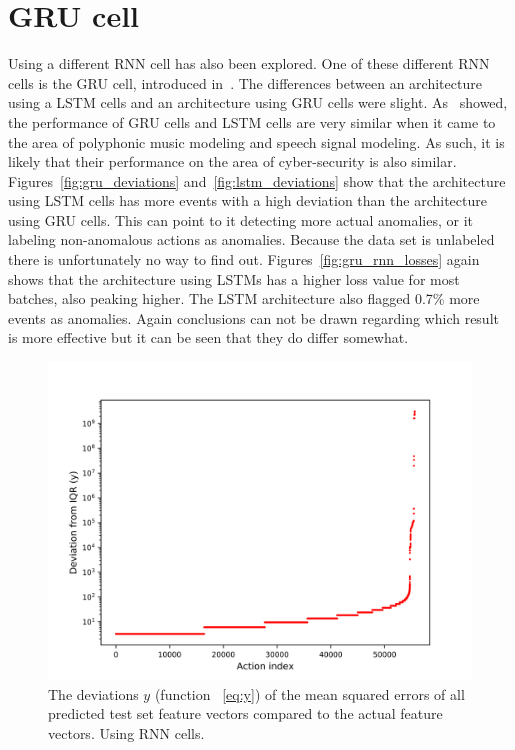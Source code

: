 \section{GRU cell}
Using a different RNN cell has also been explored. One of these different RNN cells is the GRU cell, introduced in~\cite{cho2014learning}. The differences between an architecture using a LSTM cells and an architecture using GRU cells were slight. As~\cite{chung2014empirical} showed, the performance of GRU cells and LSTM cells are very similar when it came to the area of polyphonic music modeling and speech signal modeling. As such, it is likely that their performance on the area of cyber-security is also similar. Figures~\ref{fig:gru_deviations} and~\ref{fig:lstm_deviations} show that the architecture using LSTM cells has more events with a high deviation than the architecture using GRU cells. This can point to it detecting more actual anomalies, or it labeling non-anomalous actions as anomalies. Because the data set is unlabeled there is unfortunately no way to find out. Figures~\ref{fig:gru_rnn_losses} again shows that the architecture using LSTMs has a higher loss value for most batches, also peaking higher. The LSTM architecture also flagged 0.7\% more events as anomalies. Again conclusions can not be drawn regarding which result is more effective but it can be seen that they do differ somewhat.

\begin{figure}
	\begin{center}
		\includegraphics[scale=6.0]{experiments/cell/deviations/rnn}
	\end{center}
	\caption{The deviations \(y\) (function ~\ref{eq:y}) of the mean squared errors of all predicted test set feature vectors compared to the actual feature vectors. Using RNN cells.~\label{fig:rnn_deviations}}
\end{figure}

